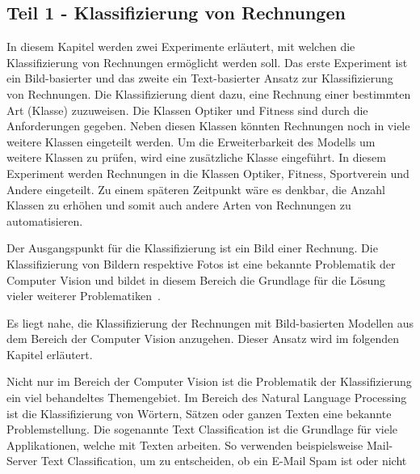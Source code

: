 \subsection{Teil 1 - Klassifizierung von Rechnungen}

In diesem Kapitel werden zwei Experimente erläutert, mit welchen die Klassifizierung von Rechnungen ermöglicht werden soll. Das erste Experiment ist ein Bild-basierter und das zweite ein Text-basierter Ansatz zur Klassifizierung von Rechnungen. Die Klassifizierung dient dazu, eine Rechnung einer bestimmten Art (Klasse) zuzuweisen. Die Klassen Optiker und Fitness sind durch die Anforderungen gegeben. Neben diesen Klassen könnten Rechnungen noch in viele weitere Klassen eingeteilt werden. Um die Erweiterbarkeit des Modells um weitere Klassen zu prüfen, wird eine zusätzliche Klasse eingeführt. In diesem Experiment werden Rechnungen in die Klassen Optiker, Fitness, Sportverein und Andere eingeteilt. Zu einem späteren Zeitpunkt wäre es denkbar, die Anzahl Klassen zu erhöhen und somit auch andere Arten von Rechnungen zu automatisieren.

Der Ausgangspunkt für die Klassifizierung ist ein Bild einer Rechnung. Die Klassifizierung von Bildern respektive Fotos ist eine bekannte Problematik der Computer Vision und bildet in diesem Bereich die Grundlage für die Lösung vieler weiterer Problematiken~\autocite{StanfordGithubClassification}. 


Es liegt nahe, die Klassifizierung der Rechnungen mit Bild-basierten Modellen aus dem Bereich der Computer Vision anzugehen. Dieser Ansatz wird im folgenden Kapitel erläutert.

Nicht nur im Bereich der Computer Vision ist die Problematik der Klassifizierung ein viel behandeltes Themengebiet. Im Bereich des Natural Language Processing ist die Klassifizierung von Wörtern, Sätzen oder ganzen Texten eine bekannte Problemstellung. Die sogenannte Text Classification ist die Grundlage für viele Applikationen, welche mit Texten arbeiten. So verwenden beispielsweise Mail-Server Text Classification, um zu entscheiden, ob ein E-Mail Spam ist oder nicht~\autocite{GoogleTextClassification}

